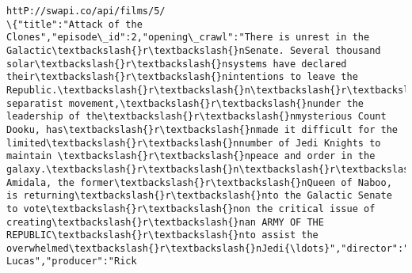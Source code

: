 \documentclass[11pt]{article}
\begin{document}
\begin{Verbatim}[commandchars=\\\{\}]
httP://swapi.co/api/films/5/
\{"title":"Attack of the Clones","episode\_id":2,"opening\_crawl":"There is unrest in the Galactic\textbackslash{}r\textbackslash{}nSenate. Several thousand solar\textbackslash{}r\textbackslash{}nsystems have declared their\textbackslash{}r\textbackslash{}nintentions to leave the Republic.\textbackslash{}r\textbackslash{}n\textbackslash{}r\textbackslash{}nThis separatist movement,\textbackslash{}r\textbackslash{}nunder the leadership of the\textbackslash{}r\textbackslash{}nmysterious Count Dooku, has\textbackslash{}r\textbackslash{}nmade it difficult for the limited\textbackslash{}r\textbackslash{}nnumber of Jedi Knights to maintain \textbackslash{}r\textbackslash{}npeace and order in the galaxy.\textbackslash{}r\textbackslash{}n\textbackslash{}r\textbackslash{}nSenator Amidala, the former\textbackslash{}r\textbackslash{}nQueen of Naboo, is returning\textbackslash{}r\textbackslash{}nto the Galactic Senate to vote\textbackslash{}r\textbackslash{}non the critical issue of creating\textbackslash{}r\textbackslash{}nan ARMY OF THE REPUBLIC\textbackslash{}r\textbackslash{}nto assist the overwhelmed\textbackslash{}r\textbackslash{}nJedi{\ldots}","director":"George Lucas","producer":"Rick 
\end{Verbatim}
\end{document}
